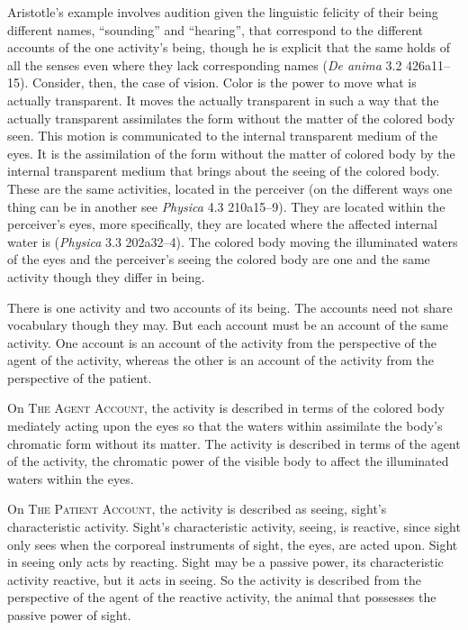Aristotle's example involves audition given the linguistic felicity of their being different names, ``sounding'' and ``hearing'', that correspond to the different accounts of the one activity's being, though he is explicit that the same holds of all the senses even where they lack corresponding names (\emph{De anima} 3.2 426a11–15). Consider, then, the case of vision. Color is the power to move what is actually transparent. It moves the actually transparent in such a way that the actually transparent assimilates the form without the matter of the colored body seen. This motion is communicated to the internal transparent medium of the eyes. It is the assimilation of the form without the matter of colored body by the internal transparent medium that brings about the seeing of the colored body. These are the same activities, located in the perceiver (on the different ways one thing can be in another see \emph{Physica} 4.3 210a15–9). They are located within the perceiver's eyes, more specifically, they are located where the affected internal water is (\emph{Physica} 3.3 202a32–4). The colored body moving the illuminated waters of the eyes and the perceiver's seeing the colored body are one and the same activity though they differ in being. 

There is one activity and two accounts of its being. The accounts need not share vocabulary though they may. But each account must be an account of the same activity. One account is an account of the activity from the perspective of the agent of the activity, whereas the other is an account of the activity from the perspective of the patient.

On \textsc{The Agent Account}, the activity is described in terms of the colored body mediately acting upon the eyes so that the waters within assimilate the body's chromatic form without its matter. The activity is described in terms of the agent of the activity, the chromatic power of the visible body to affect the illuminated waters within the eyes.

On \textsc{The Patient Account}, the activity is described as seeing, sight's characteristic activity. Sight's characteristic activity, seeing, is reactive, since sight only sees when the corporeal instruments of sight, the eyes, are acted upon. Sight in seeing only acts by reacting. Sight may be a passive power, its characteristic activity reactive, but it acts in seeing. So the activity is described from the perspective of the agent of the reactive activity, the animal that possesses the passive power of sight.

